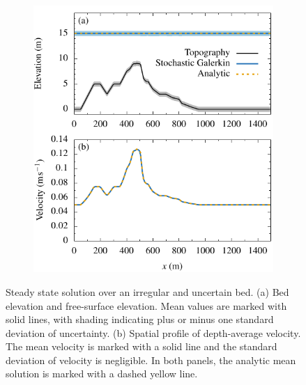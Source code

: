 \begin{figure}
    \centering
    \begin{subfigure}{\textwidth}
    \centering
    \label{fig:tsengSteadyState-flow:elevation}
    \label{fig:tsengSteadyState-flow:u}
    \includegraphics{fig-tsengSteadyState-flow.pdf}
    \end{subfigure}
    \caption{Steady state solution over an irregular and uncertain bed.
    (a) Bed elevation and free-surface elevation.
    Mean values are marked with solid lines, with shading indicating plus or minus one standard deviation of uncertainty.
    (b) Spatial profile of depth-average velocity.
    The mean velocity is marked with a solid line and the standard deviation of velocity is negligible.
    In both panels, the analytic mean solution is marked with a dashed yellow line.}
    \label{fig:tsengSteadyState-flow}
\end{figure}

